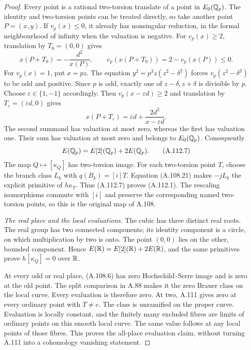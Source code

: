 \begin{proof}
Every point is a rational two-torsion translate
of a point in $E_0(\mathbb Q_p)$.
The identity and two-torsion points can be treated
directly, so take another point $P=(x,y)$.
If $v_p(x)\le0$, it already has nonsingular
reduction, in the formal neighbourhood of infinity
when the valuation is negative.
For $v_p(x)\ge2$, translation by $T_0=(0,0)$ gives
\[
 x(P+T_0)=-\frac{d^2}{x(P)},\qquad
                v_p(x(P+T_0))=2-v_p(x(P))\le0.
\tag{A.112.5}
\]
For $v_p(x)=1$, put $x=pz$.
The equation $y^2=p^3z(z^2-\delta^2)$ forces
$v_p(z^2-\delta^2)$ to be odd and positive.
Since $p$ is odd, exactly one of $z-\delta,z+\delta$
is divisible by $p$.
Choose $\varepsilon\in\{1,-1\}$ accordingly.
Then $v_p(x-\varepsilon d)\ge2$ and translation by
$T_\varepsilon=(\varepsilon d,0)$ gives
\[
       x(P+T_\varepsilon)
         =\varepsilon d+\frac{2d^2}{x-\varepsilon d}.
\tag{A.112.6}
\]
The second summand has valuation at most zero,
whereas the first has valuation one.
Their sum has valuation at most zero and belongs
to $E_0(\mathbb Q_p)$.
Consequently
\[
                    E(\mathbb Q_p)=E[2](\mathbb Q_p)+2E(\mathbb Q_p).
\tag{A.112.7}
\]
The map $Q\mapsto[\kappa_Q]$ has two-torsion image.
For each two-torsion point $T$, choose the branch
class $L_k$ with $q(B_k)=[i]T$.
Equation (A.108.21) makes $-jL_k$ the explicit
primitive of $h\kappa_T$.
Thus (A.112.7) proves (A.112.1).
The rescaling isomorphisms commute with $[i]$
and preserve the corresponding named two-torsion
points, so this is the original map of A.108.

\emph{The real place and the local evaluations.}
The cubic has three distinct real roots.
The real group has two connected components;
its identity component is a circle, on which
multiplication by two is onto.
The point $(0,0)$ lies on the other, bounded
component. Hence
$E(\mathbb R)=E[2](\mathbb R)+2E(\mathbb R)$, and the same primitives
prove $h[\kappa_Q]=0$ over $\mathbb R$.

At every odd or real place, (A.108.6) has zero
Hochschild--Serre image and is zero at the old
point. The split comparison in A.88 makes it
the zero Brauer class on the local curve.
Every evaluation is therefore zero.
At two, A.111 gives zero at every ordinary
point with $T\ne c$.
The class is unramified on the proper curve.
Evaluation is locally constant, and the finitely
many excluded fibres are limits of ordinary points
on this smooth local curve.
The same value follows at any local points of those
fibres. This proves the all-place evaluation claim,
without turning A.111 into a cohomology vanishing
statement.


\end{proof}
